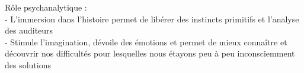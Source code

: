 Rôle psychanalytique :\\
- L'immersion dans l'histoire permet de libérer des instincts primitifs et l'analyse des auditeurs\\
- Stimule l'imagination, dévoile des émotions et permet de mieux connaître et découvrir nos difficultés pour lesquelles nous étayons peu à peu inconsciemment des solutions\\

\clearpage
